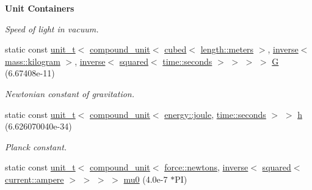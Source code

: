 \begin{Indent}{\bf Unit Containers}
\begin{DoxyCompactItemize}
\begin{DoxyCompactList}\small\item\em Speed of light in vacuum. \end{DoxyCompactList}\item 
\hypertarget{namespaceunits_1_1constants_aba8ca60b3ebe7810babd3e1550e0e3a6}{}static const \hyperlink{classunits_1_1unit__t}{unit\+\_\+t}$<$ \hyperlink{group___unit_types_ga9c3f6f077dc894620e1ed8358442a8f1}{compound\+\_\+unit}$<$ \hyperlink{group___unit_manipulators_gad3e94dc693fe45a580b382cb666434a1}{cubed}$<$ \hyperlink{structunits_1_1unit}{length\+::meters} $>$, \hyperlink{group___unit_manipulators_gaacc539ef162e24b260d023d3ff949b57}{inverse}$<$ \hyperlink{structunits_1_1unit}{mass\+::kilogram} $>$, \hyperlink{group___unit_manipulators_gaacc539ef162e24b260d023d3ff949b57}{inverse}$<$ \hyperlink{group___unit_manipulators_ga636346f7898c35eb98a796bec1d77fb2}{squared}$<$ \hyperlink{structunits_1_1unit}{time\+::seconds} $>$ $>$ $>$ $>$ \hyperlink{namespaceunits_1_1constants_aba8ca60b3ebe7810babd3e1550e0e3a6}{G} (6.\+67408e-\/11)\label{namespaceunits_1_1constants_aba8ca60b3ebe7810babd3e1550e0e3a6}

\begin{DoxyCompactList}\small\item\em Newtonian constant of gravitation. \end{DoxyCompactList}\item 
\hypertarget{namespaceunits_1_1constants_a193cee77d3adc2eac3678f5c3f7ecf04}{}static const \hyperlink{classunits_1_1unit__t}{unit\+\_\+t}$<$ \hyperlink{group___unit_types_ga9c3f6f077dc894620e1ed8358442a8f1}{compound\+\_\+unit}$<$ \hyperlink{structunits_1_1unit}{energy\+::joule}, \hyperlink{structunits_1_1unit}{time\+::seconds} $>$ $>$ \hyperlink{namespaceunits_1_1constants_a193cee77d3adc2eac3678f5c3f7ecf04}{h} (6.\+626070040e-\/34)\label{namespaceunits_1_1constants_a193cee77d3adc2eac3678f5c3f7ecf04}

\begin{DoxyCompactList}\small\item\em Planck constant. \end{DoxyCompactList}\item 
\hypertarget{namespaceunits_1_1constants_a65b9f097ea8f09448637adf41488b1d9}{}static const \hyperlink{classunits_1_1unit__t}{unit\+\_\+t}$<$ \hyperlink{group___unit_types_ga9c3f6f077dc894620e1ed8358442a8f1}{compound\+\_\+unit}$<$ \hyperlink{structunits_1_1unit}{force\+::newtons}, \hyperlink{group___unit_manipulators_gaacc539ef162e24b260d023d3ff949b57}{inverse}$<$ \hyperlink{group___unit_manipulators_ga636346f7898c35eb98a796bec1d77fb2}{squared}$<$ \hyperlink{structunits_1_1unit}{current\+::ampere} $>$ $>$ $>$ $>$ \hyperlink{namespaceunits_1_1constants_a65b9f097ea8f09448637adf41488b1d9}{mu0} (4.\+0e-\/7 $\ast$\+P\+I)\label{namespaceunits_1_1constants_a65b9f097ea8f09448637adf41488b1d9}


\end{DoxyCompactItemize}
\end{Indent}
